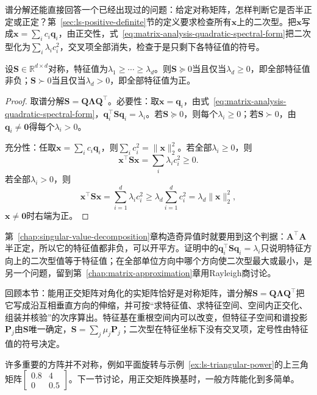 谱分解还能直接回答一个已经出现过的问题：给定对称矩阵，怎样判断它是否半正定或正定？第~\ref{sec:ls-positive-definite}节的定义要求检查所有$\bm x$上的二次型。把$\bm x$写成$\bm x=\sum_ic_i\bm q_i$，由正交性，式~\eqref{eq:matrix-analysis-quadratic-spectral-form}把二次型化为$\sum_i\lambda_ic_i^2$，交叉项全部消失，检查于是只剩下各特征值的符号。

\begin{theorem}[用特征值判定定号性]
\label{thm:ls-symmetric-definiteness-eigenvalues}
设$\bm S\in\mathbb R^{d\times d}$对称，特征值为$\lambda_1\geq\cdots\geq\lambda_d$。则$\bm S\succeq0$当且仅当$\lambda_d\geq0$，即全部特征值非负；$\bm S\succ0$当且仅当$\lambda_d>0$，即全部特征值为正。
\end{theorem}

\begin{proof}
取谱分解$\bm S=\bm Q\bm\Lambda\bm Q^\top$。必要性：取$\bm x=\bm q_i$，由式~\eqref{eq:matrix-analysis-quadratic-spectral-form}，$\bm q_i^\top\bm S\bm q_i=\lambda_i$。若$\bm S\succeq0$，则每个$\lambda_i\geq0$；若$\bm S\succ0$，由$\bm q_i\neq\bm0$得每个$\lambda_i>0$。

充分性：任取$\bm x=\sum_ic_i\bm q_i$，则$\sum_ic_i^2=\lVert\bm x\rVert_2^2$。若全部$\lambda_i\geq0$，则
\[
 \bm x^\top\bm S\bm x=\sum_i\lambda_ic_i^2\geq0 .
\]
若全部$\lambda_i>0$，则
\[
 \bm x^\top\bm S\bm x=\sum_{i=1}^d\lambda_ic_i^2\geq\lambda_d\sum_{i=1}^dc_i^2=\lambda_d\lVert\bm x\rVert_2^2 ,
\]
$\bm x\neq\bm0$时右端为正。
\end{proof}

第~\ref{chap:singular-value-decomposition}章构造奇异值时就要用到这个判据：$\bm A^\top\bm A$半正定，所以它的特征值都非负，可以开平方。证明中的$\bm q_i^\top\bm S\bm q_i=\lambda_i$只说明特征方向上的二次型值等于特征值；在全部单位方向中哪个方向使二次型最大或最小，是另一个问题，留到第~\ref{chap:matrix-approximation}章用Rayleigh商讨论。

回顾本节：能用正交矩阵对角化的实矩阵恰好是对称矩阵，谱分解$\bm S=\bm Q\bm\Lambda\bm Q^\top$把它写成沿互相垂直方向的伸缩，并可按“求特征值、求特征空间、空间内正交化、组装并核验”的次序算出。特征基在重根空间内可以改变，但特征子空间和谱投影$\bm P_j$由$\bm S$唯一确定，$\bm S=\sum_j\mu_j\bm P_j$；二次型在特征坐标下没有交叉项，定号性由特征值的符号决定。

许多重要的方阵并不对称，例如平面旋转与示例~\ref{ex:ls-triangular-power}的上三角矩阵$\left[\begin{smallmatrix}0.8&4\\0&0.5\end{smallmatrix}\right]$。下一节讨论，用正交矩阵换基时，一般方阵能化到多简单。
